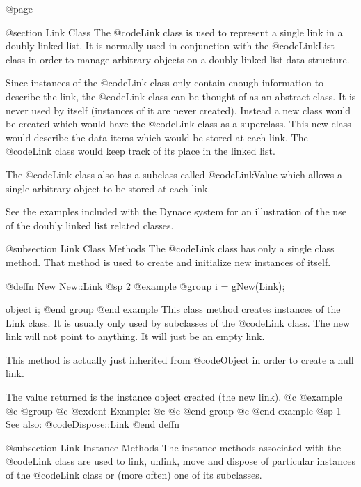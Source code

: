 @page

@section Link Class
The @code{Link} class is used to represent a single link in a doubly
linked list.  It is normally used in conjunction with the
@code{LinkList} class in order to manage arbitrary objects on a doubly
linked list data structure.

Since instances of the @code{Link} class only contain enough information
to describe the link, the @code{Link} class can be thought of as an
abstract class.  It is never used by itself (instances of it are never
created).  Instead a new class would be created which would have the
@code{Link} class as a superclass.  This new class would describe
the data items which would be stored at each link.  The @code{Link}
class would keep track of its place in the linked list.

The @code{Link} class also has a subclass called @code{LinkValue} which
allows a single arbitrary object to be stored at each link.

See the examples included with the Dynace system for an illustration of the
use of the doubly linked list related classes.


@subsection Link Class Methods
The @code{Link} class has only a single class method.  That method is used
to create and initialize new instances of itself.




@deffn {New} New::Link
@sp 2
@example
@group
i = gNew(Link);

object  i;
@end group
@end example
This class method creates instances of the Link class.  It is usually
only used by subclasses of the @code{Link} class.  The new link
will not point to anything.  It will just be an empty link.

This method is actually just inherited from @code{Object} in order
to create a null link.

The value returned is the instance object created (the new link).
@c @example
@c @group
@c @exdent Example:
@c 
@c @end group
@c @end example
@sp 1
See also:  @code{Dispose::Link}
@end deffn





@subsection Link Instance Methods
The instance methods associated with the @code{Link} class are used to
link, unlink, move and dispose of particular instances of the
@code{Link} class or (more often) one of its subclasses.
















